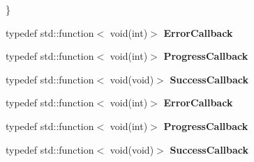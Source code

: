 \begin{DoxyCompactItemize}
 \}
\item 
\mbox{\label{classAssetsManager_ab4f90202a149a326e85571b14d4f8988}} 
typedef std\+::function$<$ void(int)$>$ {\bfseries Error\+Callback}
\item 
\mbox{\label{classAssetsManager_a498d71bf7480b55816caa6a8b16becc9}} 
typedef std\+::function$<$ void(int)$>$ {\bfseries Progress\+Callback}
\item 
\mbox{\label{classAssetsManager_a4e573c918a678b47a2d5439d4c46c686}} 
typedef std\+::function$<$ void(void)$>$ {\bfseries Success\+Callback}
\item 
\mbox{\label{classAssetsManager_ab4f90202a149a326e85571b14d4f8988}} 
typedef std\+::function$<$ void(int)$>$ {\bfseries Error\+Callback}
\item 
\mbox{\label{classAssetsManager_a498d71bf7480b55816caa6a8b16becc9}} 
typedef std\+::function$<$ void(int)$>$ {\bfseries Progress\+Callback}
\item 
\mbox{\label{classAssetsManager_a4e573c918a678b47a2d5439d4c46c686}} 
typedef std\+::function$<$ void(void)$>$ {\bfseries Success\+Callback}
\end{DoxyCompactItemize}
